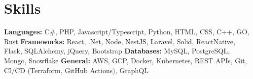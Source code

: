 \vspace{5 pt - 0.3 cm}
\section{Skills}
\begin{onecolentry}
    \textbf{Languages:} C\#, PHP, Javascript/Typescript, Python, HTML, CSS, C++, GO, Rust \newline
    \textbf{Frameworks:} React, .Net, Node, NestJS, Laravel, Solid, ReactNative, Flask, SQLAlchemy, jQuery, Bootstrap  \newline
    \textbf{Databases:} MySQL, PostgreSQL, Mongo, Snowflake \newline
    \textbf{General:} AWS, GCP, Docker, Kubernetes, REST APIs, Git, CI/CD (Terraform, GitHub Actions), GraphQL  \newline
\end{onecolentry}